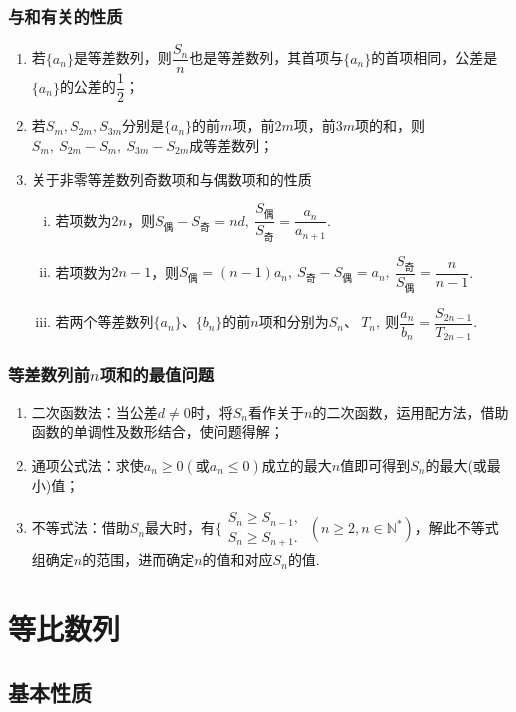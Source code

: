\documentclass{BHCexam}
\begin{document}
\subsubsection{与和有关的性质}
\begin{enumerate}[(1)]
\item 若$\{a_n\}$是等差数列，则$ \dfrac{S_n}{n} $也是等差数列，其首项与$ \{a_n\} $的首项相同，公差是$\{a_n\}$的公差的$ \dfrac{1}{2} $；
\item 若$ S_m,S_{2m},S_{3m} $分别是$\{a_n\}$的前$ m $项，前$ 2m $项，前$ 3m $项的和，则$ S_m,~S_{2m}-S_m,~S_{3m}-S_{2m} $成等差数列；
\item 关于非零等差数列奇数项和与偶数项和的性质\begin{enumerate}[i)]
\item 若项数为$ 2n $，则$ S_{\text{偶}}-S_{\text{奇}}=nd ,~\dfrac{S_{\text{偶}}}{S_{\text{奇}}}=\dfrac{a_n}{a_{n+1}}$.
\item 若项数为$ 2n-1 $，则$  S_{\text{偶}}=(n-1)a_n,~S_{\text{奇}}-S_{\text{偶}}=a_n,~\dfrac{S_{\text{奇}}}{S_{\text{偶}}}=\dfrac{n}{n-1}$.
\item 若两个等差数列$\{a_n\}$、$\{b_n\}$的前$ n $项和分别为$ S_n\text{、}~T_n,~ $则$ \dfrac{a_n}{b_n}=\dfrac{S_{2n-1}}{T_{2n-1}} $.
\end{enumerate}
\end{enumerate}
\subsubsection{等差数列前$ n $项和的最值问题}
\begin{enumerate}[1)]
\item 二次函数法：当公差$d\ne0$时，将$ S_n $看作关于$ n $的二次函数，运用配方法，借助函数的单调性及数形结合，使问题得解；
\item 通项公式法：求使$ a_n\ge0 \left(\text{或}a_n\le0\right)$成立的最大$ n $值即可得到$ S_n $的最大(或最小)值；
\item 不等式法：借助$ S_n $最大时，有$\Bigg\{\begin{aligned}
S_n\ge S_{n-1},\\
S_n\ge S_{n+1}.
\end{aligned}~(n\ge2,n\in\mathbb{N^*})$，解此不等式组确定$ n $的范围，进而确定$ n $的值和对应$ S_n $的值.
\end{enumerate}
\section{等比数列}
\subsection{基本性质}
\end{document}
